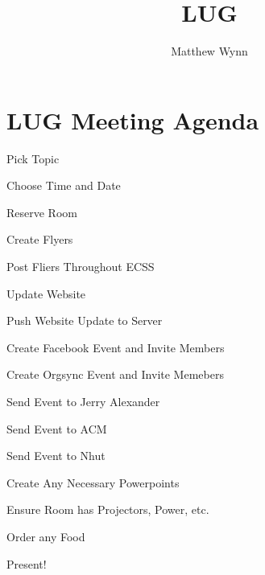 \documentclass[12pt,letterpaper,oneside]{article}
\title{LUG}
\author{Matthew Wynn}
\newenvironment{checklist}{%
	\begin{list}{}{}%
	\let\olditem\item
	\renewcommand\item{\olditem[$\Box$] }
	}{%
	\end{list}
}
\begin{document}
\section*{LUG Meeting Agenda}
\begin{checklist}
	\item Pick Topic
	\item Choose Time and Date
	\item Reserve Room
	\item Create Flyers
	\item Post Fliers Throughout ECSS
	\item Update Website
	\item Push Website Update to Server
	\item Create Facebook Event and Invite Members
	\item Create Orgsync Event and Invite Memebers
	\item Send Event to Jerry Alexander
	\item Send Event to ACM
	\item Send Event to Nhut
	\item Create Any Necessary Powerpoints
	\item Ensure Room has Projectors, Power, etc.
	\item Order any Food
	\item Present!
\end{checklist}
\end{document}
